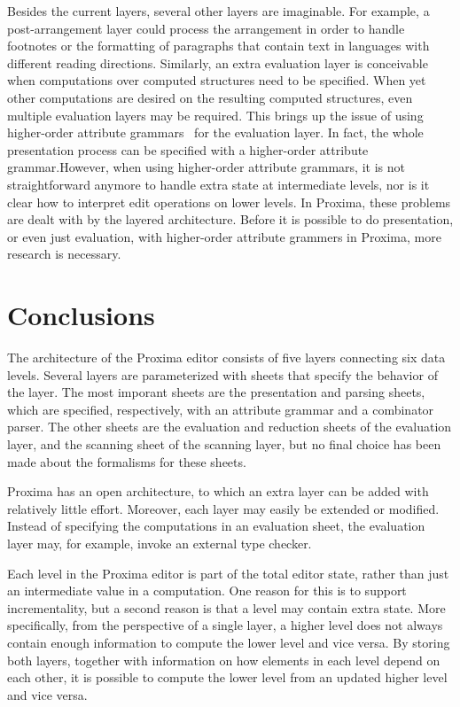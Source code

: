 Besides the current layers, several other layers are imaginable. For example, a post-arrangement layer could process the arrangement in order to handle footnotes or the formatting of paragraphs that contain text in languages with different reading directions. Similarly, an extra evaluation layer is conceivable when computations over computed structures need to be specified. When yet other computations are desired on the resulting computed structures, even multiple evaluation layers may be required. This brings up the issue of using higher-order attribute grammars~\cite{vogt89Hags} for the evaluation layer. \bc In fact, the whole presentation process can be specified with a higher-order attribute grammar.\ec However, when using higher-order attribute grammars, it is not straightforward anymore to handle extra state at intermediate levels, nor is it clear how to interpret edit operations on lower levels. In Proxima, these problems are dealt with by the layered architecture. Before it is possible to do presentation, or even just evaluation, with higher-order attribute grammers in Proxima, more research is necessary.

\section{Conclusions}

The architecture of the Proxima editor consists of five layers connecting six data levels. Several layers are parameterized with sheets that specify the behavior of the layer. The most imporant sheets are the presentation and parsing sheets, which are specified, respectively, with an attribute grammar and a combinator parser. The other sheets are the evaluation and reduction sheets of the evaluation layer, and the scanning sheet of the scanning layer, but no final choice has been made about the formalisms for these sheets.

Proxima has an open architecture, to which an extra layer can be added with relatively little effort. Moreover, each layer may easily be extended or modified. Instead of specifying the computations in an evaluation sheet, the evaluation layer may, for example, invoke an external type checker. 

Each level in the Proxima editor is part of the total editor state, rather than just an intermediate value in a computation. One reason for this is to support incrementality, but a second reason is that a level may contain extra state. More specifically, from the perspective of a single layer, a higher level does not always contain enough information to compute the lower level and vice versa. By storing both layers, together with information on how elements in each level depend on each other, it is possible to compute the lower level from an updated higher level and vice versa.

